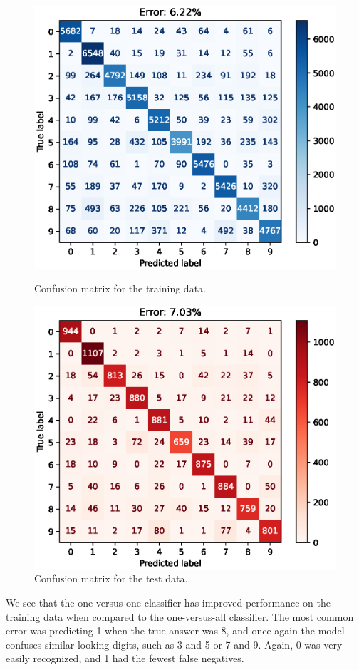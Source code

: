 \documentclass{article}
\begin{document}
\begin{figure}[h!]
    \centering
    \begin{minipage}{0.5\textwidth}
        \centering
        \includegraphics[width=\textwidth]{images/one_vs_one_train_confusion_matrix.eps}
        \caption{Confusion matrix for the training data.}
    \end{minipage}\hfill
    \begin{minipage}{0.5\textwidth}
        
        \centering
        \includegraphics[width=\textwidth]{images/one_vs_one_test_confusion_matrix.eps}
        \caption{Confusion matrix for the test data.}
    \end{minipage}
\end{figure}
We see that the one-versus-one classifier has improved performance on the training data when compared to the one-versus-all classifier.
The most common error was predicting 1 when the true answer was 8, and once again the model confuses similar looking digits, such as 3 and 5 or 7 and 9.
Again, 0 was very easily recognized, and 1 had the fewest false negatives.
\end{document}
